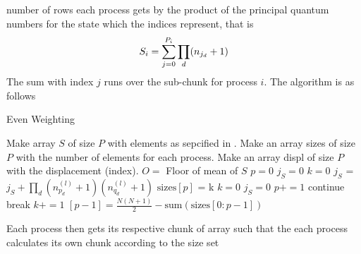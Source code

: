     number of rows each process gets by the product of the principal quantum
    numbers for the state which the indices represent, that is
        \begin{equation}
            S_i = \suml{j=0}{P_i} \prod_d (n_{j_d}+1)
            \label{eq:Sdefpar}
        \end{equation}
    The sum with index $j$ runs over the sub-chunk for process $i$.
    The algorithm is as follows
        \begin{algorithm}[H]
            \caption{Even Weighting}\label{alg:parasumweight}
            \begin{algorithmic}[H]
                \State Make array $S$ of size $P$ with elements as sepcified in
                .
                \State Make an array sizes of size $P$ with the number of
                elements for each process.
                \State Make an array displ of size $P$ with the displacement
                (index).
                \State $O = $ Floor of mean of $S$
                \State $p = 0$ 
                \State $j_S = 0$ 
                \State $k = 0$ 
                 
                    \State $j_S$ = $j_S + \prod\limits_d (n^{(l)}_{p_d}+1)
                    (n^{(l)}_{q_d}+1)$
                     
                        \State $\text{sizes}[p]$ = k 
                        \State $k=0$ 
                        \State $j_S=0$ 
                        \State $p += 1$ 
                        \State continue 
                    \EndIf
                     
                        \State break
                    \EndIf
                    \State $k += 1$
                \EndFor
                \State$[p-1] = \frac{N(N+1)}{2} -
                \text{sum}(\text{sizes}[0:p-1])$ 
            \end{algorithmic}
        \end{algorithm}
    Each process then gets its respective chunk of  array such
    that the each process calculates its own chunk according to the size set
